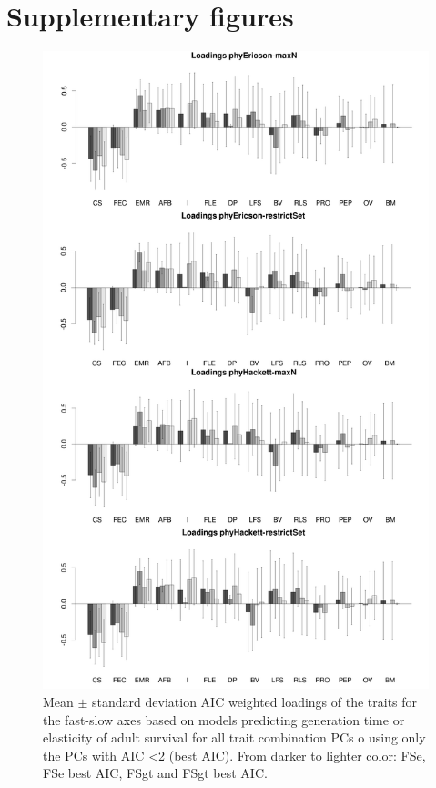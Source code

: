 \clearpage%


\section*{Supplementary figures}

\begin{figure}[ht!]
\centering
\includegraphics[width=.8\textwidth]{./Figures/Appendix2_1/FS loadings plots-ALL.png}
\caption[LHT loadings of the FS axes]{
Mean $\pm$ standard deviation AIC weighted loadings of the traits for the
fast-slow axes based on models predicting generation time or elasticity of
adult survival for all trait combination PCs o using only the PCs with AIC
\textless{2} (best AIC). From darker to lighter color: FSe, FSe best AIC, FSgt
and FSgt best AIC.}
\label{fig:figApp2.1}
\end{figure}

